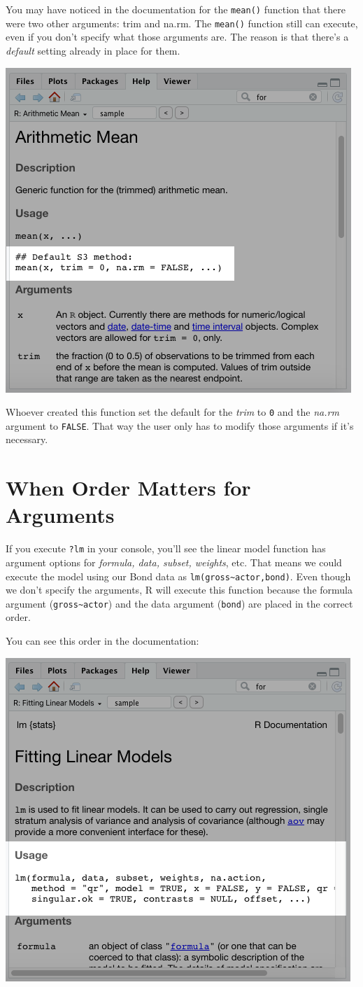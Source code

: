 \documentclass[
]{book}
\begin{document}
\begin{center}
You may have noticed in the documentation for the \texttt{mean()} function that there were two other arguments: trim and na.rm. The \texttt{mean()} function still can execute, even if you don't specify what those arguments are. The reason is that there's a \emph{default} setting already in place for them.

\begin{center}\includegraphics[width=0.5\linewidth]{1.48.1_Function_Documentation} \end{center}

Whoever created this function set the default for the \emph{trim} to \texttt{0} and the \emph{na.rm} argument to \texttt{FALSE}. That way the user only has to modify those arguments if it's necessary.

\hypertarget{when-order-matters-for-arguments}{%
\section{When Order Matters for Arguments}\label{when-order-matters-for-arguments}}

If you execute \texttt{?lm} in your console, you'll see the linear model function has argument options for \emph{formula, data, subset, weights}, etc. That means we could execute the model using our Bond data as \texttt{lm(gross\textasciitilde{}actor,bond)}. Even though we don't specify the arguments, R will execute this function because the formula argument (\texttt{gross\textasciitilde{}actor}) and the data argument (\texttt{bond}) are placed in the correct order.

You can see this order in the documentation:

\begin{center}\includegraphics[width=0.5\linewidth]{1.50_Function_Documentation} \end{center}


\end{center}
\end{document}
